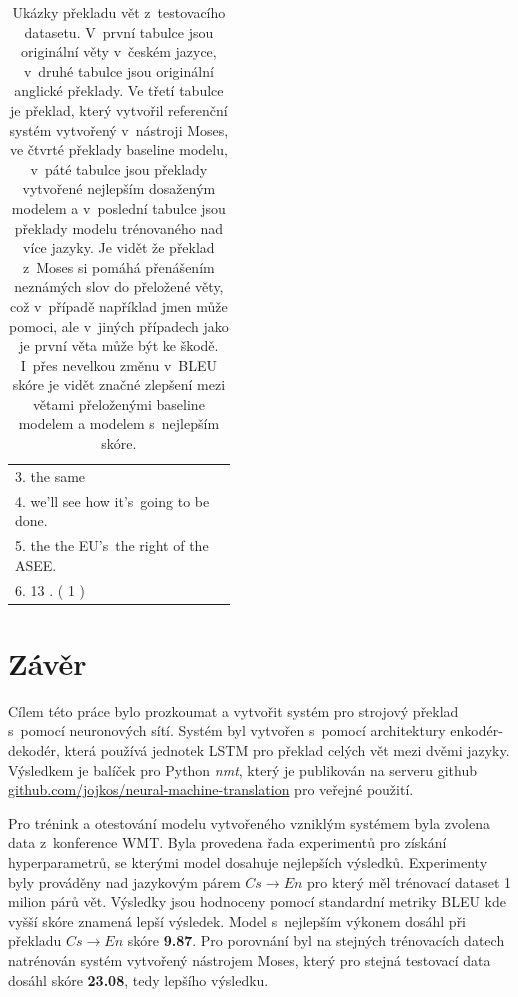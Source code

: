 \begin{table}[H]
\begin{center}
\begin{tabular}{p{0.44\linewidth}}
          3. the same \\
          4. we'll see how it's~going to be done. \\
          5. the the EU's~the right of the ASEE. \\
          6. 13 . ( 1 ) \\
          \bottomrule
        \end{tabular}
    \end{center}
	\caption{Ukázky překladu vět z~testovacího datasetu. V~první tabulce jsou originální věty v~českém jazyce, v~druhé tabulce jsou originální anglické překlady. Ve třetí tabulce je překlad, který vytvořil referenční systém vytvořený v~nástroji Moses, ve čtvrté překlady baseline modelu, v~páté tabulce jsou překlady vytvořené nejlepším dosaženým modelem a v~poslední tabulce jsou překlady modelu trénovaného nad více jazyky. Je vidět že překlad z~Moses si pomáhá přenášením neznámých slov do přeložené věty, což v~případě například jmen může pomoci, ale v~jiných případech jako je první věta může být ke škodě. I~přes nevelkou změnu v~BLEU skóre je vidět značné zlepšení mezi větami přeloženými baseline modelem a modelem s~nejlepším skóre.}
	\label{img:exampleResults}
\end{table}

\chapter{Závěr}
Cílem této práce bylo prozkoumat a vytvořit systém pro strojový překlad s~pomocí neuronových sítí. Systém byl vytvořen s~pomocí architektury enkodér-dekodér, která používá jednotek LSTM pro překlad celých vět mezi dvěmi jazyky. Výsledkem je balíček pro Python \emph{nmt}, který je publikován na serveru github \url{github.com/jojkos/neural-machine-translation} pro veřejné použití.

Pro trénink a otestování modelu vytvořeného vzniklým systémem byla zvolena data z~konference WMT. Byla provedena řada experimentů pro získání hyperparametrů, se kterými model dosahuje nejlepších výsledků. Experimenty byly prováděny nad jazykovým párem $Cs\rightarrow En$ pro který měl trénovací dataset 1 milion párů vět. Výsledky jsou hodnoceny pomocí standardní metriky BLEU kde vyšší skóre znamená lepší výsledek. Model s~nejlepším výkonem dosáhl při překladu $Cs\rightarrow En$ skóre \textbf{9.87}. Pro porovnání byl na stejných trénovacích datech natrénován systém vytvořený nástrojem Moses, který pro stejná testovací data dosáhl skóre \textbf{23.08}, tedy lepšího výsledku.

